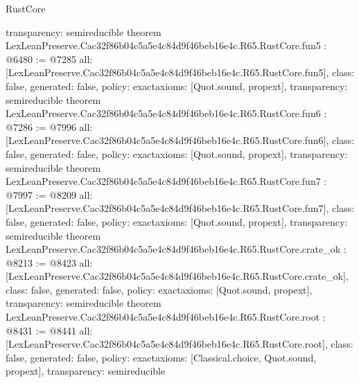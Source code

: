 \begin{lexlean}{RustCore}
\begin{coremodule}
{  transparency: semireducible
}
theorem LexLeanPreserve.Cac32f86b04c5a5e4c84d9f46beb16e4c.R65.RustCore.fun5 : @6480 := @7285 {
  all: [LexLeanPreserve.Cac32f86b04c5a5e4c84d9f46beb16e4c.R65.RustCore.fun5],
  class: false,
  generated: false,
  policy: exact{axioms: [Quot.sound, propext]},
  transparency: semireducible
}
theorem LexLeanPreserve.Cac32f86b04c5a5e4c84d9f46beb16e4c.R65.RustCore.fun6 : @7286 := @7996 {
  all: [LexLeanPreserve.Cac32f86b04c5a5e4c84d9f46beb16e4c.R65.RustCore.fun6],
  class: false,
  generated: false,
  policy: exact{axioms: [Quot.sound, propext]},
  transparency: semireducible
}
theorem LexLeanPreserve.Cac32f86b04c5a5e4c84d9f46beb16e4c.R65.RustCore.fun7 : @7997 := @8209 {
  all: [LexLeanPreserve.Cac32f86b04c5a5e4c84d9f46beb16e4c.R65.RustCore.fun7],
  class: false,
  generated: false,
  policy: exact{axioms: [Quot.sound, propext]},
  transparency: semireducible
}
theorem LexLeanPreserve.Cac32f86b04c5a5e4c84d9f46beb16e4c.R65.RustCore.crate_ok : @8213 := @8423 {
  all: [LexLeanPreserve.Cac32f86b04c5a5e4c84d9f46beb16e4c.R65.RustCore.crate_ok],
  class: false,
  generated: false,
  policy: exact{axioms: [Quot.sound, propext]},
  transparency: semireducible
}
theorem LexLeanPreserve.Cac32f86b04c5a5e4c84d9f46beb16e4c.R65.RustCore.root : @8431 := @8441 {
  all: [LexLeanPreserve.Cac32f86b04c5a5e4c84d9f46beb16e4c.R65.RustCore.root],
  class: false,
  generated: false,
  policy: exact{axioms: [Classical.choice, Quot.sound, propext]},
  transparency: semireducible
}


\end{coremodule}
\end{lexlean}
